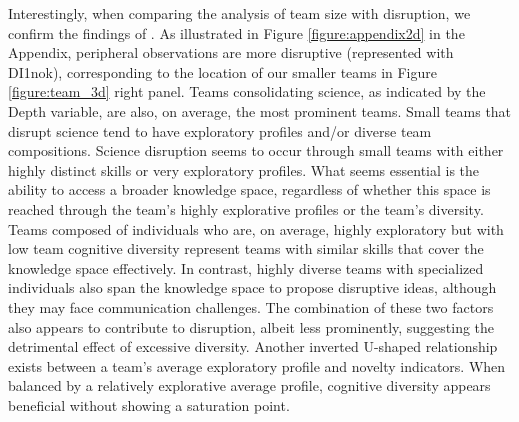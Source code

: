 Interestingly, when comparing the analysis of team size with disruption, we confirm the findings of \cite{wu_wu_2019}. As illustrated in Figure \ref{figure:appendix2d} in the Appendix, peripheral observations are more disruptive (represented with DI1nok), corresponding to the location of our smaller teams in Figure \ref{figure:team_3d} right panel. Teams consolidating science, as indicated by the Depth variable, are also, on average, the most prominent teams. Small teams that disrupt science tend to have exploratory profiles and/or diverse team compositions. Science disruption seems to occur through small teams with either highly distinct skills or very exploratory profiles. What seems essential is the ability to access a broader knowledge space, regardless of whether this space is reached through the team's highly explorative profiles or the team's diversity. Teams composed of individuals who are, on average, highly exploratory but with low team cognitive diversity represent teams with similar skills that cover the knowledge space effectively. In contrast, highly diverse teams with specialized individuals also span the knowledge space to propose disruptive ideas, although they may face communication challenges. The combination of these two factors also appears to contribute to disruption, albeit less prominently, suggesting the detrimental effect of excessive diversity.
Another inverted U-shaped relationship exists between a team's average exploratory profile and novelty indicators. When balanced by a relatively explorative average profile, cognitive diversity appears beneficial without showing a saturation point.


